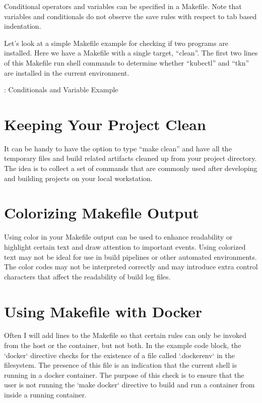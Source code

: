 \justifying
Conditional operators and variables can be specified in a Makefile. Note that variables and conditionals do not observe the save rules with respect to tab based indentation.

\justifying
Let's look at a simple Makefile example for checking if two programs are installed. Here we have a Makefile
with a single target, ``clean''. The first two lines of this Makefile run shell commands to determine
whether ``kubectl'' and ``tkn'' are installed in the current environment.

\begin{mybox}{\thetcbcounter: Conditionals and Variable Example}
	
\end{mybox}

\section{Keeping Your Project Clean}

\justifying
It can be handy to have the option to type ``make clean'' and have all the temporary files and build related artifacts cleaned up from your project directory. The idea is to collect a set of commands that are commonly used after developing and building projects on your local workstation.


\section{Colorizing Makefile Output}

\justifying
Using color in your Makefile output can be used to enhance readability or highlight certain text
and draw attention to important events. Using colorized text may not be ideal for use in build
pipelines or other automated environments. The color codes may not be interpreted correctly and may
introduce extra control characters that affect the readability of build log files.


\section{Using Makefile with Docker}

\justifying
Often I will add lines to the Makefile so that certain rules can only be invoked from the host or the container, but not both. In the example code block, the `docker` directive checks for the existence of a
file called `.dockerenv` in the filesystem. The presence of this file is an indication that the current
shell is running in a docker container. The purpose of this check is to ensure that the user is not running
the `make docker` directive to build and run a container from inside a running container.

